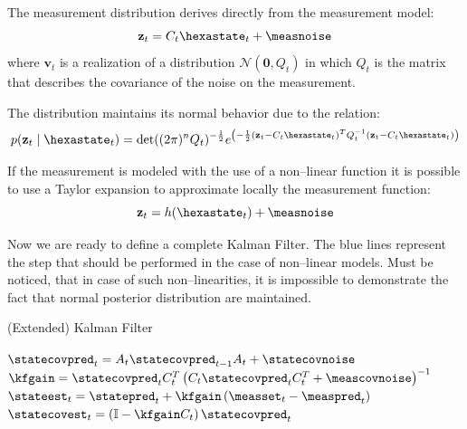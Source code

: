 The measurement distribution derives directly from the measurement model:
\begin{equation}
\mathbf{z}_t = C_t \hexastate_t + \measnoise
\end{equation}
where ${\mathbf{v}_t}$ is a realization of a distribution ${\mathcal{N}(\mathbf{0},Q_t)}$ in which $Q_t$ is the matrix that describes the covariance of the noise on the measurement.

The distribution maintains its normal behavior due to the relation:
\[p(\mathbf{z}_t\mid\hexastate_t) = \det((2\pi)^n Q_t)^{-\frac{1}{2}} e^{\left( -\frac{1}{2} (\mathbf{z}_t - C_t \hexastate_t)^T Q_t^{-1} (\mathbf{z}_t - C_t \hexastate_t) \right)}\]

If the measurement is modeled with the use of a non--linear function it is possible to use a Taylor expansion to approximate locally the measurement function:
\begin{equation}
\mathbf{z}_t = h(\hexastate_t) + \measnoise
\end{equation}

Now we are ready to define a complete Kalman Filter. The blue lines represent the step that should be performed in the case of non--linear models. Must be noticed, that in case of such non--linearities, it is impossible to demonstrate the fact that normal posterior distribution are maintained.
\begin{algorithm}[h]
\caption{(Extended) Kalman Filter}
${\statecovpred_t = A_t \statecovpred_{t-1} A_t + \statecovnoise}$ \;
${\kfgain = \statecovpred_t C_t^T \braces{ C_t \statecovpred_t C_t^T + \meascovnoise }^{-1}}$ \;
${\stateest_t = \statepred_t + \kfgain \braces{\measset_t - \measpred_t}}$ \;
${\statecovest_t = \braces{\mathbb{I} - \kfgain C_t} \statecovpred_t}$ \;
\end{algorithm}
\FloatBarrier

